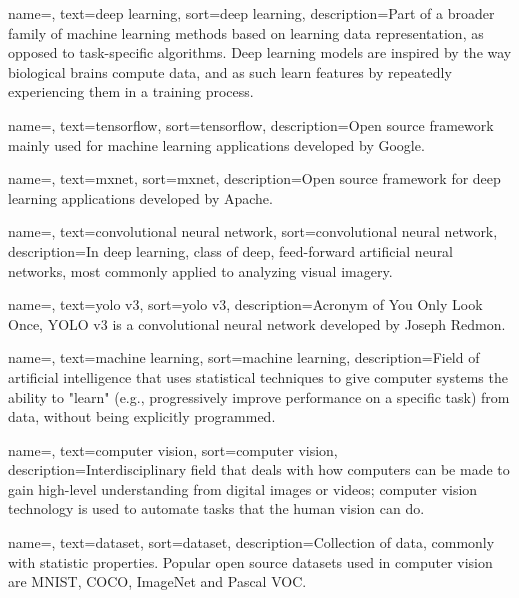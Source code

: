 {
	name=,
	text=deep learning,
	sort=deep learning,
	description={Part of a broader family of machine learning methods based on learning data representation, as opposed to task-specific algorithms. Deep learning models are inspired by the way biological brains compute data, and as such learn features by repeatedly experiencing them in a training process.}
}

{
	name=,
	text=tensorflow,
	sort=tensorflow,
	description={Open source framework mainly used for machine learning applications developed by Google.}
}

{
	name=,
	text=mxnet,
	sort=mxnet,
	description={Open source framework for deep learning applications developed by Apache.}
}

{
	name=,
	text=convolutional neural network,
	sort=convolutional neural network,
	description={In deep learning, class of deep, feed-forward artificial neural networks, most commonly applied to analyzing visual imagery.}
}

{
	name=,
	text=yolo v3,
	sort=yolo v3,
	description={Acronym of You Only Look Once, YOLO v3 is a convolutional neural network developed by Joseph Redmon.}
}

{
	name=,
	text=machine learning,
	sort=machine learning,
	description={Field of artificial intelligence that uses statistical techniques to give computer systems the ability to "learn" (e.g., progressively improve performance on a specific task) from data, without being explicitly programmed.}
}

{
	name=,
	text=computer vision,
	sort=computer vision,
	description={Interdisciplinary field that deals with how computers can be made to gain high-level understanding from digital images or videos; computer vision technology is used to automate tasks that the human vision can do.}
}

{
	name=,
	text=dataset,
	sort=dataset,
	description={Collection of data, commonly with statistic properties. Popular open source datasets used in computer vision are MNIST, COCO, ImageNet and Pascal VOC.}
}

